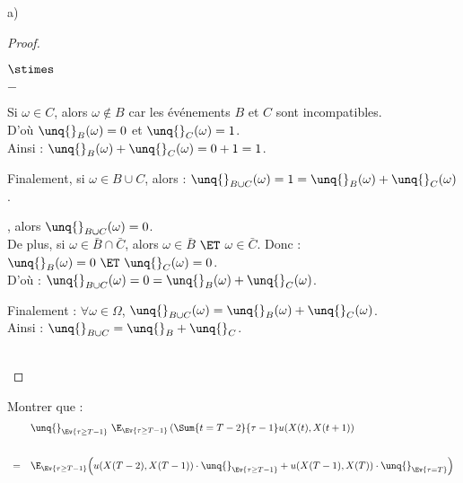 \begin{noliste}{a)}
\begin{proof}
\begin{remark}
\begin{noliste}{$\stimes$}
\begin{liste}{$-$}
	    \item Si $\omega \in C$, alors $\omega \notin B$ car les
	    événements $B$ et $C$ sont incompatibles.\\
	    D'où $\unq{}_B(\omega)=0$ et $\unq{}_C(\omega)=1$.\\
	    Ainsi : $\unq{}_B(\omega) + \unq{}_C(\omega) = 0+1=1$.
	  \end{liste}
	  Finalement, si $\omega \in B \cup C$, alors :
	  $\unq{}_{B \cup C}(\omega) = 1 = \unq{}_B(\omega) + \unq{}_C
	  (\omega)$.
	  
	  \item {}, alors $\unq{}_{B \cup C}(\omega)
	  =0$.\\[.1cm]
	  De plus, si $\omega \in \bar{B} \cap \bar{C}$, alors 
	  $\omega \in \bar{B}$ $\ET$ $\omega \in \bar{C}$. Donc : 
	  $\unq{}_B(\omega)=0 \ \ET \ \unq{}_C(\omega)=0$.\\
	  D'où : $\unq{}_{B \cup C}(\omega)=0= \unq{}_B(\omega) + 
	  \unq{}_C(\omega)$.
        \end{noliste}
        Finalement : $\forall \omega \in \Omega$, $\unq{}_{B \cup C}
        (\omega) = \unq{}_B(\omega) + \unq{}_C(\omega)$.\\
        Ainsi : $\unq{}_{B \cup C} = \unq{}_B + \unq{}_C$.
      \end{remark}~\\[-1.4cm]
    \end{proof}
    
    \item Montrer que :
    \[
     \begin{array}{cl}
      & \unq{}_{\Ev{\tau \geq T-1}} \ \E_{\Ev{\tau \geq T-1}} 
      \left( \Sum{t=T-2}{\tau -1} u(X(t),X(t+1)\right) 
      \\[.8cm]
      = &
      \E_{\Ev{\tau \geq T-1}} \Big( u(X(T-2),X(T-1)) \cdot
      \unq{}_{\Ev{\tau \geq T-1}} + u(X(T-1),X(T)) \cdot 
      \unq{}_{\Ev{\tau = T}}\Big)
     \end{array}
    \]
    

\end{noliste}
